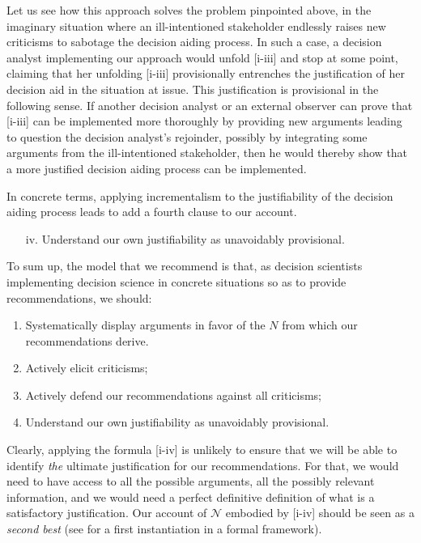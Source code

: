 \documentclass[preprint, french, english, 11pt, authoryear]{elsarticle}%
\newcommand{\adv}{\mathscr{N}}
\begin{document}
Let us see how this approach solves the problem pinpointed above, in the imaginary situation where an ill-intentioned stakeholder endlessly raises new criticisms to sabotage the decision aiding process. In such a case, a decision analyst implementing our approach would unfold [i-iii] and stop at some point, claiming that her unfolding [i-iii] provisionally entrenches the justification of her decision aid in the situation at issue. This justification is provisional in the following sense. If another decision analyst or an external observer can prove that [i-iii] can be implemented more thoroughly by providing new arguments leading to question the decision analyst's rejoinder, possibly by integrating some arguments from the ill-intentioned stakeholder, then he would thereby show that a more justified decision aiding process can be implemented.

In concrete terms, applying incrementalism to the justifiability of the decision aiding process leads to add a fourth clause to our account.
\begin{itemize}
\item[iv.]	Understand our own justifiability as unavoidably provisional.
\end{itemize}

To sum up, the model that we recommend is that, as decision scientists implementing decision science in concrete situations so as to provide recommendations, we should:
\begin{enumerate}[label=\roman*.]
	\item Systematically display arguments in favor of the $N$ from which our recommendations derive.
	\item Actively elicit criticisms;
	\item Actively defend our recommendations against all criticisms;
	\item Understand our own justifiability as unavoidably provisional.
\end{enumerate}

Clearly, applying the formula [i-iv] is unlikely to ensure that we will be able to identify \emph{the} ultimate justification for our recommendations. For that, we would need to have access to all the possible arguments, all the possibly relevant information, and we would need a perfect definitive definition of what is a satisfactory justification. Our account of $\adv$ embodied by [i-iv] should be seen as a \emph{second best} (see \cite{cailloux_formal_2018} for a first instantiation in a formal framework).
\end{document}
